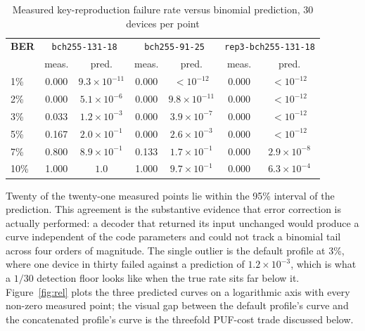 \documentclass[journal]{IEEEtran}
\begin{document}
\begin{table}[H]
\centering
\caption{Measured key-reproduction failure rate versus binomial prediction,
30 devices per point}
\label{tab:noise}
\scriptsize
\setlength{\tabcolsep}{2.2pt}
\begin{tabular}{@{}lcccccc@{}}
\toprule
\textbf{BER} & \multicolumn{2}{c}{\texttt{bch255-131-18}} &
\multicolumn{2}{c}{\texttt{bch255-91-25}} &
\multicolumn{2}{c}{\texttt{rep3-bch255-131-18}} \\
 & meas. & pred. & meas. & pred. & meas. & pred. \\
\midrule
1\%  & 0.000 & $9.3{\times}10^{-11}$ & 0.000 & $<10^{-12}$ & 0.000 & $<10^{-12}$ \\
2\%  & 0.000 & $5.1{\times}10^{-6}$  & 0.000 & $9.8{\times}10^{-11}$ & 0.000 & $<10^{-12}$ \\
3\%  & 0.033 & $1.2{\times}10^{-3}$  & 0.000 & $3.9{\times}10^{-7}$ & 0.000 & $<10^{-12}$ \\
5\%  & 0.167 & $2.0{\times}10^{-1}$  & 0.000 & $2.6{\times}10^{-3}$ & 0.000 & $<10^{-12}$ \\
7\%  & 0.800 & $8.9{\times}10^{-1}$  & 0.133 & $1.7{\times}10^{-1}$ & 0.000 & $2.9{\times}10^{-8}$ \\
10\% & 1.000 & $1.0$                 & 1.000 & $9.7{\times}10^{-1}$ & 0.000 & $6.3{\times}10^{-4}$ \\
\bottomrule
\end{tabular}
\end{table}

Twenty of the twenty-one measured points lie within the 95\% interval of the
prediction. This agreement is the substantive evidence that error correction is
actually performed: a decoder that returned its input unchanged would produce a
curve independent of the code parameters and could not track a binomial tail
across four orders of magnitude. The single outlier is the default profile at
3\%, where one device in thirty failed against a prediction of
$1.2\times10^{-3}$, which is what a $1/30$ detection floor looks like when the
true rate sits far below it. Figure~\ref{fig:rel} plots the three predicted
curves on a logarithmic axis with every non-zero measured point; the visual gap
between the default profile's curve and the concatenated profile's curve is the
threefold PUF-cost trade discussed below.
\end{document}
